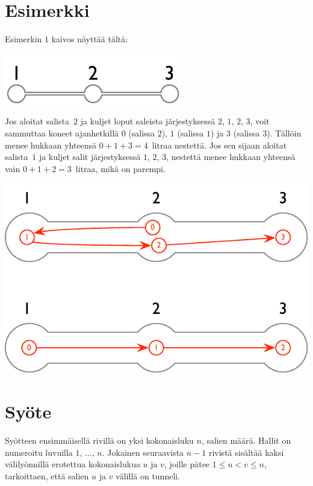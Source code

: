 \section*{Esimerkki}

Esimerkin $1$ kaivos näyttää tältä:

\includegraphics[width=.2\textwidth]{img/sample-1.pdf}

Jos aloitat salista~$2$ ja kuljet loput saleista järjestyksessä $2$, $1$, $2$, $3$,
voit sammuttaa koneet ajanhetkillä $0$ (salissa $2$), $1$ (salissa $1$) ja $3$ (salissa $3$).
Tällöin menee hukkaan yhteensä $0+1+3=4$~litraa nestettä.
Jos sen sijaan aloitat salista~$1$ ja kuljet salit järjestyksessä $1$, $2$, $3$, nestettä menee hukkaan yhteensä vain $0+1+2=3$~litraa, mikä on parempi.

\includegraphics[width=.4\textwidth]{img/sample-1-ans.pdf}

\section*{Syöte}

Syötteen ensimmäisellä rivillä on yksi kokonaisluku $n$, salien määrä.
Hallit on numeroitu luvuilla $1$, $\ldots$, $n$.
Jokainen seuraavista $n-1$ rivistä sisältää kaksi välilyönnillä erotettua kokonaislukua $u$ ja $v$, joille pätee
$1\leq u < v \leq n$, %
tarkoittaen, että salien $u$ ja $v$ välillä on tunneli.

